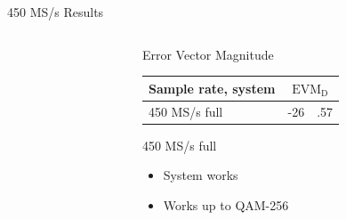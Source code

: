 \documentclass[10pt]{beamer}
\newcommand{\mc}[2]{\multicolumn{#1}{c|}{#2}}
\begin{document}
\begin{frame}{450 MS/s Results}
\begin{columns}[T]
\begin{column}{.5\textwidth}
    \end{column}
    \begin{column}{.5\textwidth}
      \begin{block}{Error Vector Magnitude}
        \begin{tabular}{|l|r@{}l|}
          \hline
          Sample rate, system             & \mc{2}{$\text{EVM}_\text{D}$} \\ \hline
          450 MS/s full                   & -26&.57      \\ \hline
        \end{tabular}
      \end{block}
      \begin{block}{450 MS/s full}
        \begin{itemize}
        \item System works
        \item Works up to QAM-256
        \end{itemize}
      \end{block}
    \end{column}
  \end{columns}
\end{frame}
\end{document}
